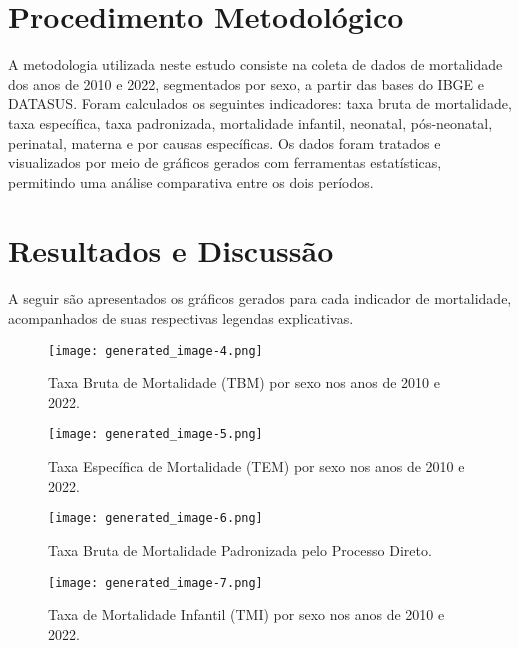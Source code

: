 \documentclass[12pt]{article}
\begin{document}
\section{Procedimento Metodológico}
A metodologia utilizada neste estudo consiste na coleta de dados de mortalidade dos anos de 2010 e 2022, segmentados por sexo, a partir das bases do IBGE e DATASUS. Foram calculados os seguintes indicadores: taxa bruta de mortalidade, taxa específica, taxa padronizada, mortalidade infantil, neonatal, pós-neonatal, perinatal, materna e por causas específicas. Os dados foram tratados e visualizados por meio de gráficos gerados com ferramentas estatísticas, permitindo uma análise comparativa entre os dois períodos.

\section{Resultados e Discussão}
A seguir são apresentados os gráficos gerados para cada indicador de mortalidade, acompanhados de suas respectivas legendas explicativas.

\begin{figure}[H]
    \centering
    \begin{minipage}[b]{0.48\textwidth}
        \texttt{[image: generated\_image-4.png]}
        \caption{Taxa Bruta de Mortalidade (TBM) por sexo nos anos de 2010 e 2022.}
    \end{minipage}
    \hfill
    \begin{minipage}[b]{0.48\textwidth}
        \texttt{[image: generated\_image-5.png]}
        \caption{Taxa Específica de Mortalidade (TEM) por sexo nos anos de 2010 e 2022.}
    \end{minipage}
\end{figure}

\begin{figure}[H]
    \centering
    \begin{minipage}[b]{0.48\textwidth}
        \texttt{[image: generated\_image-6.png]}
        \caption{Taxa Bruta de Mortalidade Padronizada pelo Processo Direto.}
    \end{minipage}
    \hfill
    \begin{minipage}[b]{0.48\textwidth}
        \texttt{[image: generated\_image-7.png]}
        \caption{Taxa de Mortalidade Infantil (TMI) por sexo nos anos de 2010 e 2022.}
    \end{minipage}
\end{figure}
\end{document}
